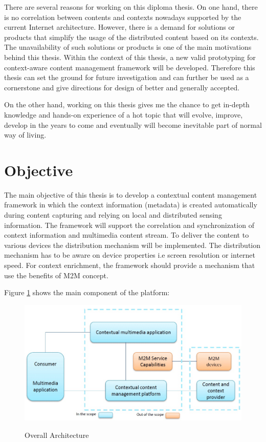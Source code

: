 There are several reasons for working on this diploma thesis. On one hand, there is no correlation between contents and contexts nowadays supported by the current Internet architecture. However, there is a demand for solutions or products that simplify the usage of the distributed content based on its contexts. The unavailability of such solutions or products is one of the main motivations behind this thesis. Within the context of this thesis, a new valid prototyping for context-aware content management framework will be developed. Therefore this thesis can set the ground for future investigation and can further be used as a cornerstone and give directions for design of better and generally accepted.

On the other hand, working on this thesis gives me the chance to get in-depth knowledge and hands-on experience of a hot topic that will evolve, improve, develop in the years to come and eventually will become inevitable part of normal way of living.

\section{Objective\label{sec:objective}}

The main objective of this thesis is to develop a contextual content management framework in which the context information (metadata) is created automatically during content capturing and relying on local and distributed sensing information. The framework will support the correlation and synchronization of context information and multimedia content stream. To deliver the content to various devices the distribution mechanism will be implemented. The distribution mechanism has to be aware on device properties i.e screen resolution or internet speed. For context enrichment, the framework should provide a mechanism that use the benefits of \ac{M2M} concept.

Figure \ref{fig:oarch} shows the main component of the platform:
\begin{figure}[htb]
  \centering
  \includegraphics[scale=0.5]{DA-OverallArchitecture.jpg}\\
  \caption{Overall Architecture}
  \label{fig:oarch}
\end{figure}


